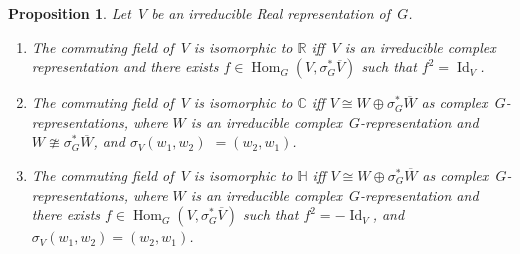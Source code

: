 \documentclass[pdftex]{sigma}
\numberwithin{equation}{section}
\newtheorem{Proposition}[Theorem]{Proposition}
{\theoremstyle{definition}
\newtheorem{Definition}[Theorem]{Definition}
\newtheorem{Example}[Theorem]{Example}
\newtheorem{Remark}[Theorem]{Remark}
}
\DeclareMathOperator{\Hom}{Hom}
\DeclareMathOperator{\Id}{Id}
\begin{document}
\begin{Proposition}
\label{realrepclassification}
Let~$V$ be an irreducible Real representation of~$G$.
\begin{enumerate}\itemsep=0pt
\item[$1.$]
The commuting field of~$V$ is isomorphic to $\mathbb{R}$ iff~$V$ is an irreducible complex representation and there
exists $f\in\Hom_G(V,
\sigma_G^*\overline{V})$ such that $f^2=\Id_V$.
\item[$2.$]
The commuting field of~$V$ is isomorphic to $\mathbb{C}$ iff $V\cong W\oplus
\sigma_G^*\overline{W}$ as complex~$G$-representa\-tions,
where $W$ is an irreducible complex~$G$-representation and $W\ncong
\sigma_G^*\overline{W}$, and $\sigma_V(w_1, w_2)$ $=(w_2, w_1)$.
\item[$3.$]
The commuting field of~$V$ is isomorphic to $\mathbb{H}$ iff $V\cong W\oplus
\sigma_G^*\overline{W}$ as complex~$G$-repre\-sen\-ta\-tions,
where $W$ is an irreducible complex~$G$-representation and there exists
$f\in\Hom_G(V,\sigma_G^*\overline{V})$ such that $f^2=-\Id_V$, and $\sigma_V(w_1, w_2)=(w_2, w_1)$.
\end{enumerate}
\end{Proposition}
\end{document}
